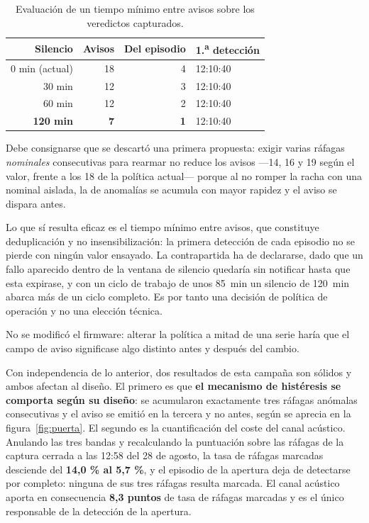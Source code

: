 \begin{table}[ht!]
\caption{Evaluación de un tiempo mínimo entre avisos sobre los veredictos capturados.}
\label{table:politica}
\centering
\begin{tabular}{|r|r|r|l|}
\hline
\textbf{Silencio} & \textbf{Avisos} & \textbf{Del episodio} & \textbf{1.\textsuperscript{a} detección} \\
\hline
0 min (actual) & 18 & 4 & 12:10:40 \\
\hline
30 min & 12 & 3 & 12:10:40 \\
\hline
60 min & 12 & 2 & 12:10:40 \\
\hline
\textbf{120 min} & \textbf{7} & \textbf{1} & 12:10:40 \\
\hline
\end{tabular}
\end{table}

Debe consignarse que se descartó una primera propuesta: exigir varias ráfagas
\textit{nominales} consecutivas para rearmar no reduce los avisos —14, 16 y 19 según el valor,
frente a los 18 de la política actual— porque al no romper la racha con una nominal aislada, la
de anomalías se acumula con mayor rapidez y el aviso se dispara antes.

Lo que sí resulta eficaz es el tiempo mínimo entre avisos, que constituye deduplicación y no
insensibilización: la primera detección de cada episodio no se pierde con ningún valor ensayado.
La contrapartida ha de declararse, dado que un fallo aparecido dentro de la ventana de silencio
quedaría sin notificar hasta que esta expirase, y con un ciclo de trabajo de unos \mbox{85 min}
un silencio de \mbox{120 min} abarca más de un ciclo completo. Es por tanto una decisión de
política de operación y no una elección técnica.

No se modificó el firmware: alterar la política a mitad de una serie haría que el campo de aviso
significase algo distinto antes y después del cambio.

Con independencia de lo anterior, dos resultados de esta campaña son sólidos y ambos afectan al diseño. El primero es que
\textbf{el mecanismo de histéresis se comporta según su diseño}: se acumularon exactamente tres
ráfagas anómalas consecutivas y el aviso se emitió en la tercera y no antes, según se aprecia en
la figura~\ref{fig:puerta}. El segundo es la cuantificación del coste del canal acústico. Anulando las tres bandas y
recalculando la puntuación sobre las ráfagas de la captura cerrada a las \mbox{12:58} del 28 de
agosto, la tasa de ráfagas
marcadas desciende del \textbf{14,0 \% al 5,7 \%}, y el episodio de la apertura deja de
detectarse por completo: ninguna de sus tres ráfagas resulta marcada. El canal acústico aporta
en consecuencia \textbf{8,3 puntos} de tasa de ráfagas marcadas y es el único responsable de la
detección de la apertura.

